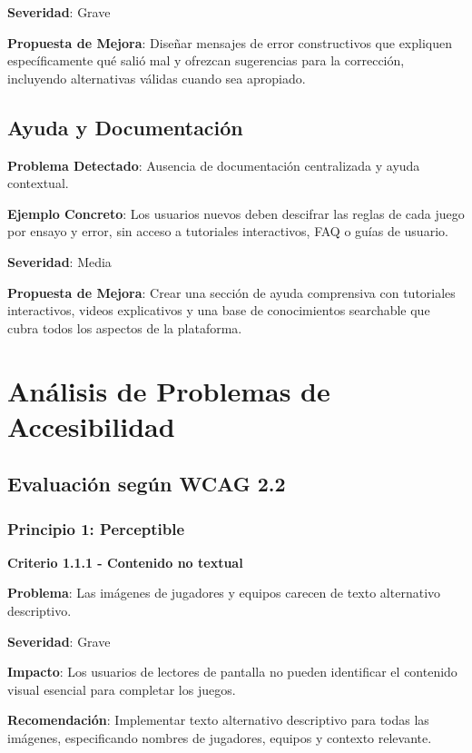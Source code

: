 \documentclass{article}
\begin{document}
	\noindent
	\textbf{Severidad}: Grave
	
	\noindent
	\textbf{Propuesta de Mejora}: Diseñar mensajes de error constructivos que expliquen específicamente qué salió mal y ofrezcan sugerencias para la corrección, incluyendo alternativas válidas cuando sea apropiado.

	\subsection{Ayuda y Documentación}
	\noindent
	\textbf{Problema Detectado}: Ausencia de documentación centralizada y ayuda contextual.
	
	\noindent
	\textbf{Ejemplo Concreto}: Los usuarios nuevos deben descifrar las reglas de cada juego por ensayo y error, sin acceso a tutoriales interactivos, FAQ o guías de usuario.
	
	\noindent
	\textbf{Severidad}: Media
	
	\noindent
	\textbf{Propuesta de Mejora}: Crear una sección de ayuda comprensiva con tutoriales interactivos, videos explicativos y una base de conocimientos searchable que cubra todos los aspectos de la plataforma.

	\section{Análisis de Problemas de Accesibilidad}

	\subsection{Evaluación según WCAG 2.2}

	\subsubsection{Principio 1: Perceptible}
	
	\noindent
	\textbf{Criterio 1.1.1 - Contenido no textual}
	
	\noindent
	\textbf{Problema}: Las imágenes de jugadores y equipos carecen de texto alternativo descriptivo.
	
	\noindent
	\textbf{Severidad}: Grave
	
	\noindent
	\textbf{Impacto}: Los usuarios de lectores de pantalla no pueden identificar el contenido visual esencial para completar los juegos.
	
	\noindent
	\textbf{Recomendación}: Implementar texto alternativo descriptivo para todas las imágenes, especificando nombres de jugadores, equipos y contexto relevante.
	
\end{document}
